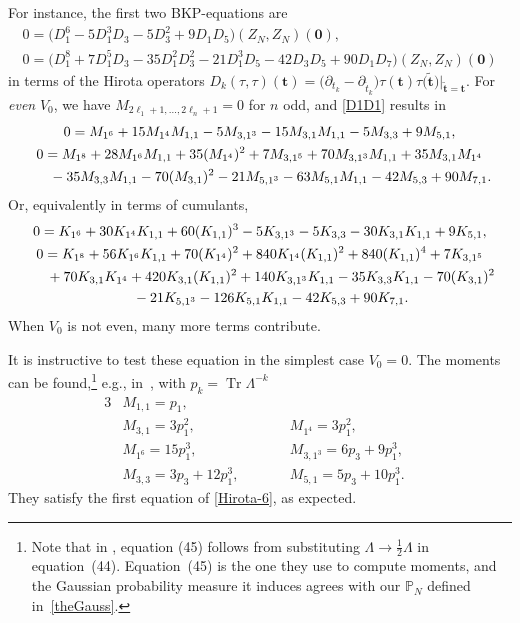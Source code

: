 \documentclass[10pt,a4paper]{amsart}
\numberwithin{equation}{section}
\begin{document}
For instance, the first two BKP-equations are
\begin{gather}
0 = \bigl(D_1^6-5 D_1^3 D_3-5 D_3^2 +9 D_1 D_5 \bigr)(Z_N,Z_N)(\mathbf{0}), \nonumber \\
0 = \bigl(D_1^8 + 7D_1^5D_3 -35D_1^2D_3^2 - 21D_1^3D_5 - 42D_3D_5 + 90D_1D_7\bigr)(Z_N,Z_N)(\mathbf{0})\label{D1D1}
\end{gather}
in terms of the Hirota operators
$D_k(\tau,\tau)(\mathbf{t}) =\bigl(\partial_{t_{k}}-\partial_{\tilde{t}_k}\bigr)
\tau(\mathbf{t})\tau\bigl(\tilde{\mathbf{t}}\bigr)\big|_{\tilde{\mathbf{t}} = \mathbf{t}}$. For \emph{even} $V_0$, we have $M_{2\ell_1 + 1,\dots,2\ell_n + 1} = 0$ for $n$ odd, and \eqref{D1D1} results in
\begin{gather}
0 = M_{1^6} + 15 M_{1^4} M_{1,1} - 5 M_{3,1^3} - 15 M_{3,1}M_{1,1} - 5M_{3,3} + 9 M_{5,1}, \nonumber\\
0 = M_{1^8} + 28M_{1^6}M_{1,1} + 35(M_{1^4})^2 + 7M_{3,1^5} + 70M_{3,1^3}M_{1,1} + 35M_{3,1}M_{1^4} \nonumber\\
\hphantom{0 =}{}
- 35M_{3,3}M_{1,1} - 70(M_{3,1})^2 - 21 M_{5,1^3} - 63M_{5,1}M_{1,1} - 42M_{5,3} + 90 M_{7,1} .\label{Hirota-6}
\end{gather}
Or, equivalently in terms of cumulants,
\begin{gather*}
0 = K_{1^6} + 30K_{1^4}K_{1,1} + 60(K_{1,1})^3 - 5K_{3,1^3} - 5K_{3,3} - 30K_{3,1}K_{1,1} + 9K_{5,1}, \\
0 = K_{1^8} + 56 K_{1^6}K_{1,1} + 70(K_{1^4})^2 + 840 K_{1^4}(K_{1,1})^2 + 840(K_{1,1})^4 + 7K_{3,1^5} \\
\hphantom{0 =}{} + 70K_{3,1}K_{1^4} + 420 K_{3,1}(K_{1,1})^2 + 140K_{3,1^3}K_{1,1} - 35 K_{3,3}K_{1,1} - 70 (K_{3,1})^2 \\
\hphantom{0 =}{} - 21K_{5,1^3} -126 K_{5,1}K_{1,1} - 42 K_{5,3} + 90 K_{7,1}.
\end{gather*}
When $V_0$ is not even, many more terms contribute.

It is instructive to test these equation in the simplest case $V_0 = 0$. The moments can be found,\footnote{Note that in \cite{Mironov:2020tjf}, equation (45) follows from substituting $\Lambda \rightarrow \frac{1}{2}\Lambda$ in equation~(44). Equation~(45) is the one they use to compute moments, and the Gaussian probability measure it induces agrees with our $\mathbb{P}_N$ defined in~\eqref{theGauss}.} e.g., in~\cite{Mironov:2020tjf}, with
$p_k = \operatorname{Tr}\Lambda^{-k}$
\begin{alignat*}{3}
&M_{1,1} = p_1, && & \\
&M_{3,1} = 3 p_1^2, \qquad && M_{1^4} = 3 p_1^2, \\
&M_{1^6} = 15 p_1^3, \qquad && M_{3,1^3} = 6 p_3+9 p_1^3, \\
&M_{3,3} =3 p_3+12 p_1^3, \qquad && M_{5,1} = 5 p_3+10 p_1^3.
\end{alignat*}
They satisfy the first equation of \eqref{Hirota-6}, as expected.
\end{document}
